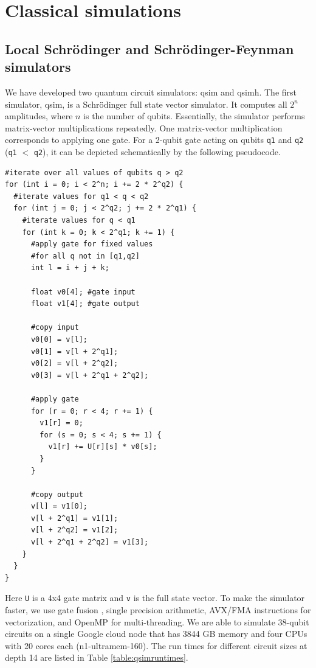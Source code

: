 \section{Classical simulations}\label{sec:classical_sim}


\subsection{Local Schr\"{o}dinger and Schr\"{o}dinger-Feynman simulators}
\label{subsec:sa_sfa}
We have developed two quantum circuit simulators: qsim and qsimh. The first simulator, qsim, is a Schr\"{o}dinger full state vector simulator. It computes all $2^n$ amplitudes, where $n$ is the number of qubits. Essentially, the simulator performs matrix-vector multiplications repeatedly. One matrix-vector multiplication corresponds to applying one gate. For a 2-qubit gate acting on qubits {\tt q1} and {\tt q2} ({\tt q1} $<$ {\tt q2}), it can be depicted schematically by the following pseudocode.

\begin{verbatim}
#iterate over all values of qubits q > q2
for (int i = 0; i < 2^n; i += 2 * 2^q2) {
  #iterate values for q1 < q < q2
  for (int j = 0; j < 2^q2; j += 2 * 2^q1) {
    #iterate values for q < q1
    for (int k = 0; k < 2^q1; k += 1) {
      #apply gate for fixed values 
      #for all q not in [q1,q2]
      int l = i + j + k;

      float v0[4]; #gate input
      float v1[4]; #gate output

      #copy input
      v0[0] = v[l];
      v0[1] = v[l + 2^q1];
      v0[2] = v[l + 2^q2];
      v0[3] = v[l + 2^q1 + 2^q2];

      #apply gate
      for (r = 0; r < 4; r += 1) {
        v1[r] = 0;
        for (s = 0; s < 4; s += 1) {
          v1[r] += U[r][s] * v0[s];
        }
      }

      #copy output
      v[l] = v1[0];
      v[l + 2^q1] = v1[1];
      v[l + 2^q2] = v1[2];
      v[l + 2^q1 + 2^q2] = v1[3];
    }
  }
}
\end{verbatim}
Here {\tt U} is a 4x4 gate matrix and {\tt v} is the full state vector. To make the simulator faster, we use gate fusion \cite{smelyanskiy2016qhipster}, single precision arithmetic, AVX/FMA instructions for vectorization, and OpenMP for multi-threading. We are able to simulate 38-qubit circuits on a single Google cloud node that has 3844 GB memory and four CPUs with 20 cores each (n1-ultramem-160). The run times for different circuit sizes at depth 14 are listed in Table \ref{table:qsimruntimes}.

